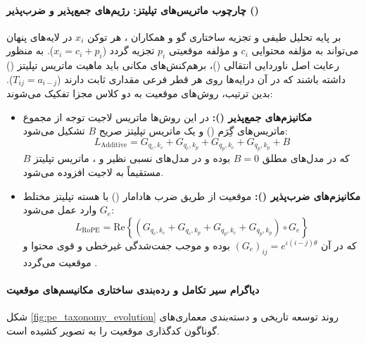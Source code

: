 \paragraph*{چارچوب ماتریس‌های تپلیتز: رژیم‌های جمع‌پذیر و ضرب‌پذیر ()}
بر پایه تحلیل طیفی و تجزیه ساختاری گو و همکاران \cite{gu2026deconstructing}، هر توکن $x_i$ در لایه‌های پنهان می‌تواند به مؤلفه محتوایی $c_i$ و مؤلفه موقعیتی $p_i$ تجزیه گردد ($x_i = c_i + p_i$). به منظور رعایت اصل ناوردایی انتقالی ()، برهم‌کنش‌های مکانی باید ماهیت ماتریس تپلیتز () داشته باشند که در آن درایه‌ها روی هر قطر فرعی مقداری ثابت دارند ($T_{ij} = a_{i-j}$). بدین ترتیب، روش‌های موقعیت به دو کلاس مجزا تفکیک می‌شوند:
\begin{itemize}
    \item \textbf{مکانیزم‌های جمع‌پذیر ():} در این روش‌ها ماتریس لاجیت توجه از مجموع ماتریس‌های گِرَم () و یک ماتریس تپلیتز صریح $B$ تشکیل می‌شود:
    \begin{equation}
        L_{\text{Additive}} = G_{q_c, k_c} + G_{q_c, k_p} + G_{q_p, k_c} + G_{q_p, k_p} + B
    \end{equation}
    که در مدل‌های مطلق $B=0$ بوده و در مدل‌های نسبی نظیر  و ، ماتریس تپلیتز $B$ مستقیماً به لاجیت افزوده می‌شود.
    \item \textbf{مکانیزم‌های ضرب‌پذیر ():} موقعیت از طریق ضرب هادامار () با هسته تپلیتز مختلط $G_e$ وارد عمل می‌شود:
    \begin{equation}
        L_{\text{RoPE}} = \text{Re}\left\{ (G_{q_c, k_c} + G_{q_c, k_p} + G_{q_p, k_c} + G_{q_p, k_p}) \circ G_e \right\}
    \end{equation}
    که در آن $(G_e)_{ij} = e^{\iota(i-j)\theta}$ بوده و موجب جفت‌شدگی غیرخطی و قوی محتوا و موقعیت می‌گردد \cite{gu2026deconstructing}.
\end{itemize}

\paragraph*{دیاگرام سیر تکامل و رده‌بندی ساختاری مکانیسم‌های موقعیت}
شکل \ref{fig:pe_taxonomy_evolution} روند توسعه تاریخی و دسته‌بندی معماری‌های گوناگون کدگذاری موقعیت را به تصویر کشیده است.

